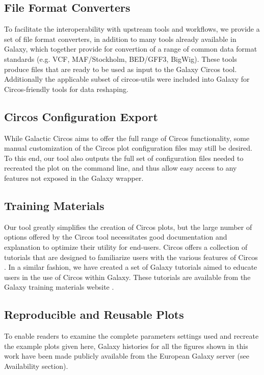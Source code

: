 \subsection*{File Format Converters}
To facilitate the interoperability with upstream tools and workflows, we provide a set of file format converters, in addition to many tools already available in Galaxy, which together provide for convertion of a range of common data format standards (e.g. VCF, MAF/Stockholm, BED/GFF3, BigWig). These tools produce files that are ready to be used as input to the Galaxy Circos tool. Additionally the applicable subset of circos-utils were included into Galaxy for Circos-friendly tools for data reshaping.

\subsection*{Circos Configuration Export}
While Galactic Circos aims to offer the full range of Circos functionality, some manual customization of the Circos plot configuration files may still be desired. To this end, our tool also outputs the full set of configuration files needed to recreated the plot on the command line, and thus allow easy access to any features not exposed in the Galaxy wrapper.

\subsection*{Training Materials}
Our tool greatly simplifies the creation of Circos plots, but the large number of options offered by the Circos tool necessitates good documentation and explanation to optimize their utility for end-users. Circos offers a collection of tutorials that are designed to familiarize users with the various features of Circos \cite{circostutorials}. In a similar fashion, we have created a set of Galaxy tutorials aimed to educate users in the use of Circos within Galaxy. These tutorials are available from the Galaxy training materials website \cite{Batut2018}.

\subsection*{Reproducible and Reusable Plots}
To enable readers to examine the complete parameters settings used and recreate the example plots given here, Galaxy histories for all the figures shown in this work have been made publicly available from the European Galaxy server (see Availability section).

